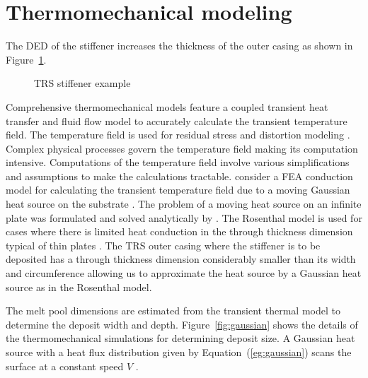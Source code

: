 \section{Thermomechanical modeling}
\label{sec:thermomech}

The \ac{DED} of the stiffener increases the thickness of the outer casing as shown in Figure~\ref{fig:TRSoverview}. 

\begin{figure}[h!]
	\centering
	 \hspace{0.1\textwidth}%
	\caption{TRS stiffener example}
	\label{fig:TRSoverview}
\end{figure}

Comprehensive thermomechanical models feature a coupled transient heat transfer and fluid flow model to accurately calculate the transient temperature field. The temperature field is used for residual stress and distortion modeling \cite{Mukherjee2017}. Complex physical processes govern the temperature field making its computation intensive. Computations of the temperature field involve various simplifications and assumptions to make the calculations tractable. \citeauthor{Manvatkar2011} consider a \ac{FEA} conduction model for calculating the transient temperature field due to a moving Gaussian heat source on the substrate \cite{Manvatkar2011}. The problem of a moving heat source on an infinite plate was formulated and solved analytically by \citeauthor{rosenthal1946theory} \cite{rosenthal1946theory}. The Rosenthal model is used for cases where there is limited heat conduction in the through thickness dimension typical of thin plates \cite{Goldak1984}. The \ac{TRS} outer casing where the stiffener is to be deposited has a through thickness dimension considerably smaller than its width and circumference allowing us to approximate the heat source by a Gaussian heat source as in the Rosenthal model.

The melt pool dimensions are estimated from the transient thermal model to determine the deposit width and depth. Figure~\ref{fig:gaussian} shows the details of the thermomechanical simulations for determining deposit size. A Gaussian heat source with a heat flux distribution given by Equation~(\ref{eg:gaussian}) scans the surface at a constant speed ${V}$ \cite{rosenthal1946theory}.

